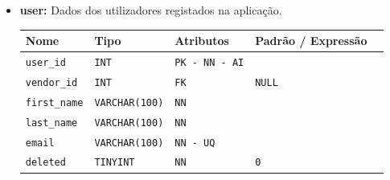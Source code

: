 \begin{itemize}

    \vspace{6pt}
    \item \textbf{user:}
     Dados dos utilizadores registados na aplicação.
    \begin{table}[H]
        \centering
        \begin{tabularx}{\linewidth}{XXXXX}
        \toprule
        \textbf{\color{color_scheme}Nome} & \textbf{\color{color_scheme}Tipo} & \textbf{\color{color_scheme}Atributos} & \textbf{\color{color_scheme}Padrão / Expressão}\\
        \midrule
        \texttt{user\_id} & \texttt{INT} & \texttt{PK - NN - AI} &\\
        \texttt{vendor\_id} & \texttt{INT}  & \texttt{FK}  & \texttt{NULL} \\
        \texttt{first\_name} & \texttt{VARCHAR(100)}  & \texttt{NN}  & \\
        \texttt{last\_name} & \texttt{VARCHAR(100)}  & \texttt{NN}  & \\
        \texttt{email} & \texttt{VARCHAR(100)}  & \texttt{NN - UQ}  & \\
        \texttt{deleted} & \texttt{TINYINT}  & \texttt{NN}  & \texttt{0} \\
        \bottomrule
        \end{tabularx}
        \label{table: user}
    \end{table}


\end{itemize}
